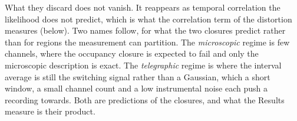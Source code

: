 What they discard does not vanish. It reappears as temporal correlation the likelihood does not
predict, which is what the correlation term of the distortion measures (below). Two names follow,
for what the two closures predict rather than for regions the measurement can partition. The
\emph{microscopic} regime is few channels, where the occupancy closure is expected to fail and
only the microscopic description is exact. The \emph{telegraphic} regime is where the interval
average is still the switching signal rather than a Gaussian, which a short window, a small
channel count and a low instrumental noise each push a recording towards. Both are predictions of
the closures, and what the Results measure is their product.

